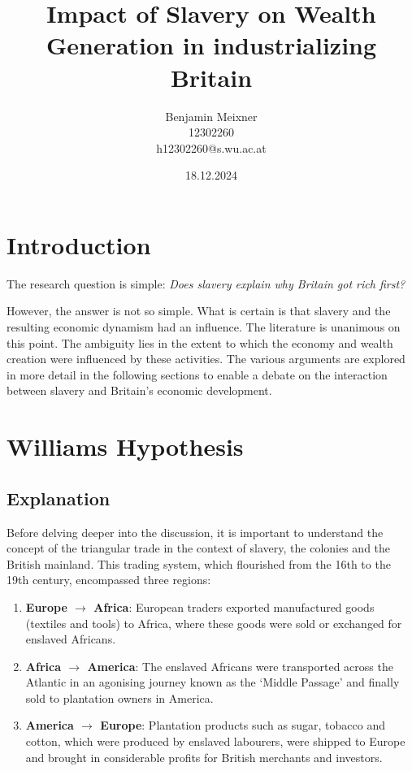 \documentclass[a4paper,11pt]{article}
\begin{document}
\title{Impact of Slavery on Wealth Generation in industrializing Britain}
\author{Benjamin Meixner \\ 12302260 \\ h12302260@s.wu.ac.at}
\date{18.12.2024} %
\maketitle

\pagebreak

\tableofcontents

\pagebreak

\section*{Introduction}

The research question is simple: \qquad \textit{Does slavery explain why Britain got rich first?}

However, the answer is not so simple. What is certain is that slavery and the resulting economic dynamism had an influence. The literature is unanimous on this point. The ambiguity lies in the extent to which the economy and wealth creation were influenced by these activities. The various arguments are explored in more detail in the following sections to enable a debate on the interaction between slavery and Britain's economic development.

\section{Williams Hypothesis}
\subsection{Explanation}

Before delving deeper into the discussion, it is important to understand the concept of the triangular trade in the context of slavery, the colonies and the British mainland. This trading system, which flourished from the 16th to the 19th century, encompassed three regions:

\begin{enumerate}
    \itemsep0em
    \item \textbf{Europe $\rightarrow$ Africa}: European traders exported manufactured goods (textiles and tools) to Africa, where these goods were sold or exchanged for enslaved Africans.

    \item \textbf{Africa $\rightarrow$ America}: The enslaved Africans were transported across the Atlantic in an agonising journey known as the ‘Middle Passage’ and finally sold to plantation owners in America.

    \item \textbf{America $\rightarrow$ Europe}: Plantation products such as sugar, tobacco and cotton, which were produced by enslaved labourers, were shipped to Europe and brought in considerable profits for British merchants and investors.
\end{enumerate}
\end{document}
